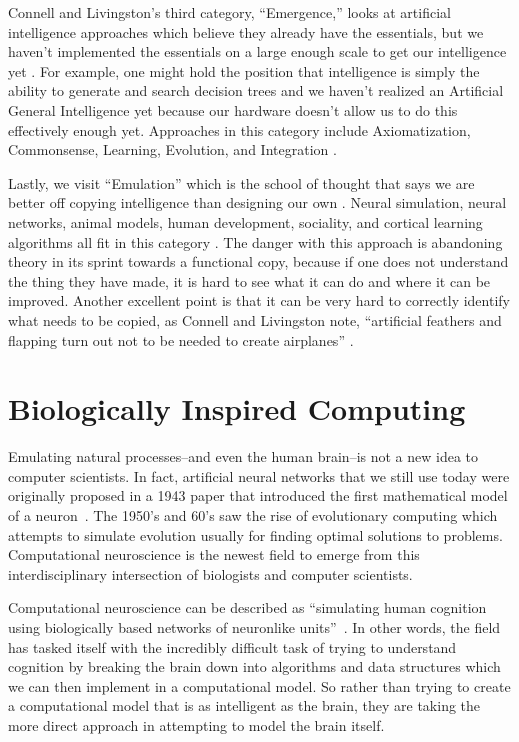 \documentclass[oneside,12pt,openany]{book}
\begin{document}
	Connell and Livingston's third category, ``Emergence,'' looks at artificial intelligence approaches which believe they already have the essentials, but we haven't implemented the essentials on a large enough scale to get our intelligence yet \cite{Connell}. For example, one might hold the position that intelligence is simply the ability to generate and search decision trees and we haven't realized an Artificial General Intelligence yet because our hardware doesn't allow us to do this effectively enough yet. Approaches in this category include Axiomatization, Commonsense, Learning, Evolution, and Integration \cite{Connell}.
	
	Lastly, we visit ``Emulation'' which is the school of thought that says we are better off copying intelligence than designing our own \cite{Connell}. Neural simulation, neural networks, animal models, human development, sociality, and cortical learning algorithms all fit in this category \cite{Connell}. The danger with this approach is abandoning theory in its sprint towards a functional copy, because if one does not understand the thing they have made, it is hard to see what it can do and where it can be improved. Another excellent point is that it can be very hard to correctly identify what needs to be copied, as Connell and Livingston note, ``artificial feathers and flapping turn out not to be needed to create airplanes'' \cite{Connell}.
	
	\section{Biologically Inspired Computing}
	
	Emulating natural processes--and even the human brain--is not a new idea to computer scientists. In fact, artificial neural networks that we still use today were originally proposed in a 1943 paper that introduced the first mathematical model of a neuron~\cite{FundNatComp}. The 1950's and 60's saw the rise of evolutionary computing which attempts to simulate evolution usually for finding optimal solutions to problems. Computational neuroscience is the newest field to emerge from this interdisciplinary intersection of biologists and computer scientists.
	
	Computational neuroscience can be described as ``simulating human cognition using biologically based networks of neuronlike units''~\cite{Eberhart}. In other words, the field has tasked itself with the incredibly difficult task of trying to understand cognition by breaking the brain down into algorithms and data structures which we can then implement in a computational model. So rather than trying to create a computational model that is as intelligent as the brain, they are taking the more direct approach in attempting to model the brain itself.
	
\end{document}
